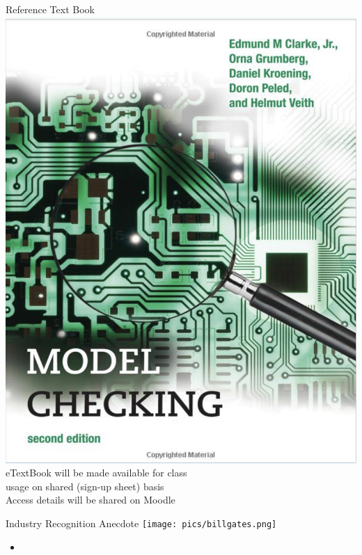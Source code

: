 \documentclass{beamer}
\begin{document}
\begin{frame}{Reference Text Book}
\includegraphics[scale=0.25]{pics/bookcover.png} \\
eTextBook will be made available for class \\
usage on shared (sign-up sheet) basis \\
Access details will be shared on Moodle
\end{frame}

\begin{frame}{Industry Recognition Anecdote}
\texttt{[image: pics/billgates.png]} 
\end{frame}

\begin{frame}{}
\begin{itemize}
\item 
\end{itemize}

\end{frame}



\begin{frame}{}

\end{frame}

\begin{frame}{}

\end{frame}
\end{document}
